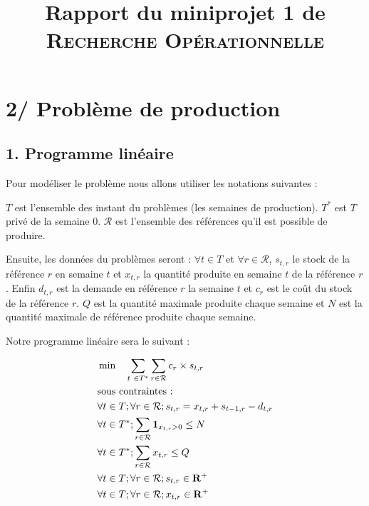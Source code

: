 \documentclass{rapport}
\title{Rapport du miniprojet 1 de \textsc{Recherche Opérationnelle}}
\begin{document}
\maketitle

\section{2/ Problème de production}

\subsection{1. Programme linéaire}

Pour modéliser le problème nous allons utiliser les notations suivantes :

$T$ est l'ensemble des instant du problèmes (les semaines de production). $T^*$ est $T$ privé de la semaine $0$. $\mathcal{R}$ est l'ensemble des références qu'il est possible de produire.

Ensuite, les données du problèmes seront : $\forall t \in T$ et $\forall r \in \mathcal{R}$, $s_{t,r}$ le stock de la référence $r$ en semaine $t$ et $x_{t,r}$ la quantité produite en semaine $t$ de la référence $r$. Enfin $d_{t,r}$ est la demande en référence $r$ la semaine $t$ et $c_r$ est le coût du stock de la référence $r$. $Q$ est la quantité maximale produite chaque semaine et $N$ est la quantité maximale de référence produite chaque semaine.

Notre programme linéaire sera le suivant :

\begin{equation*}
\begin{aligned}
& \min \ \ \  \sum_{t \in T^*} \sum_{r \in \mathcal{R}} c_r \times s_{t, r} \\
& \text{sous contraintes : } \\
& \forall t \in T; \forall r \in \mathcal{R}; s_{t,r} = x_{t,r} + s_{t-1,r} - d_{t, r}\\
& \forall t \in T^*; \sum_{r \in \mathcal{R}} \mathbf{1}_{x_{t, r} > 0} \le N \\
& \forall t \in T^*; \sum_{r \in \mathcal{R}} x_{t, r} \le Q \\
& \forall t \in T; \forall r \in \mathcal{R}; s_{t, r} \in \R^+ \\
& \forall t \in T; \forall r \in \mathcal{R}; x_{t, r} \in \R^+
\end{aligned}
\end{equation*}
\end{document}
